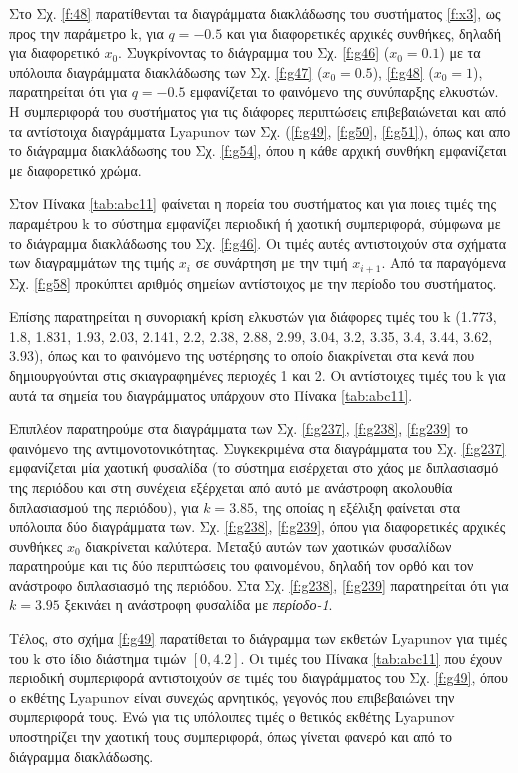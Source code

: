 Στο Σχ. \ref{f:48} παρατίθενται τα διαγράμματα διακλάδωσης του συστήματος \ref{f:x3}, ως προς την παράμετρο k, για $q =-0.5$ και για διαφορετικές αρχικές συνθήκες, δηλαδή για διαφορετικό \(x_0\). Συγκρίνοντας το διάγραμμα του Σχ. \ref{f:g46} (\(x_0=0.1\)) με τα υπόλοιπα διαγράμματα διακλάδωσης των Σχ. \ref{f:g47} (\(x_0=0.5\)), \ref{f:g48} (\(x_0=1\)), παρατηρείται ότι για $q=-0.5$ εμφανίζεται το φαινόμενο της συνύπαρξης ελκυστών. Η συμπεριφορά του συστήματος για τις διάφορες περιπτώσεις επιβεβαιώνεται και από τα αντίστοιχα διαγράμματα Lyapunov των Σχ. (\ref{f:g49}, \ref{f:g50}, \ref{f:g51}), όπως και απο το διάγραμμα διακλάδωσης του Σχ. \ref{f:g54}, όπου η κάθε αρχική συνθήκη εμφανίζεται με διαφορετικό χρώμα.

Στον Πίνακα \ref{tab:abc11} φαίνεται η πορεία του συστήματος και για ποιες τιμές της παραμέτρου k το σύστημα εμφανίζει περιοδική ή χαοτική συμπεριφορά, σύμφωνα με το διάγραμμα διακλάδωσης του Σχ. \ref{f:g46}. Οι τιμές αυτές αντιστοιχούν στα σχήματα των διαγραμμάτων της τιμής \(x_i\) σε συνάρτηση με την τιμή \(x_{i+1}\). Από τα παραγόμενα Σχ. \ref{f:g58} προκύπτει αριθμός σημείων αντίστοιχος με την περίοδο του συστήματος.

Επίσης παρατηρείται η συνοριακή κρίση ελκυστών για διάφορες τιμές του k (1.773, 1.8, 1.831, 1.93, 2.03, 2.141, 2.2, 2.38,
2.88, 2.99, 3.04, 3.2, 3.35, 3.4, 3.44, 3.62, 3.93), όπως και το φαινόμενο της υστέρησης το οποίο διακρίνεται στα κενά που δημιουργούνται στις σκιαγραφημένες περιοχές 1 και 2. Οι αντίστοιχες τιμές του k για αυτά τα σημεία του διαγράμματος υπάρχουν στο Πίνακα \ref{tab:abc11}.

Επιπλέον παρατηρούμε στα διαγράμματα των Σχ. \ref{f:g237}, \ref{f:g238}, \ref{f:g239} το φαινόμενο της αντιμονοτονικότητας. Συγκεκριμένα στα διαγράμματα του Σχ. \ref{f:g237} εμφανίζεται μία χαοτική φυσαλίδα (το σύστημα εισέρχεται στο χάος με διπλασιασμό της περιόδου και στη συνέχεια εξέρχεται από αυτό με ανάστροφη ακολουθία διπλασιασμού της περιόδου), για $k=3.85$, της οποίας η εξέλιξη φαίνεται στα υπόλοιπα δύο διαγράμματα των. Σχ. \ref{f:g238}, \ref{f:g239}, όπου για διαφορετικές αρχικές συνθήκες $x_0$ διακρίνεται καλύτερα.
Μεταξύ αυτών των χαοτικών φυσαλίδων παρατηρούμε και τις δύο περιπτώσεις του φαινομένου, δηλαδή τον ορθό και τον ανάστροφο διπλασιασμό της περιόδου. Στα Σχ. \ref{f:g238}, \ref{f:g239} παρατηρείται ότι για $k=3.95$ ξεκινάει η ανάστροφη φυσαλίδα με \emph{περίοδο-1}.

Τέλος, στο σχήμα \ref{f:g49} παρατίθεται το διάγραμμα των εκθετών Lyapunov για τιμές του k στο ίδιο διάστημα τιμών $[0, 4.2]$. Οι τιμές του Πίνακα \ref{tab:abc11} που έχουν περιοδική συμπεριφορά αντιστοιχούν σε τιμές του διαγράμματος του Σχ. \ref{f:g49}, όπου ο εκθέτης Lyapunov είναι συνεχώς αρνητικός, γεγονός που επιβεβαιώνει την συμπεριφορά τους. Ενώ για τις υπόλοιπες τιμές ο θετικός εκθέτης Lyapunov υποστηρίζει την χαοτική τους συμπεριφορά, όπως γίνεται φανερό και από το διάγραμμα διακλάδωσης.





